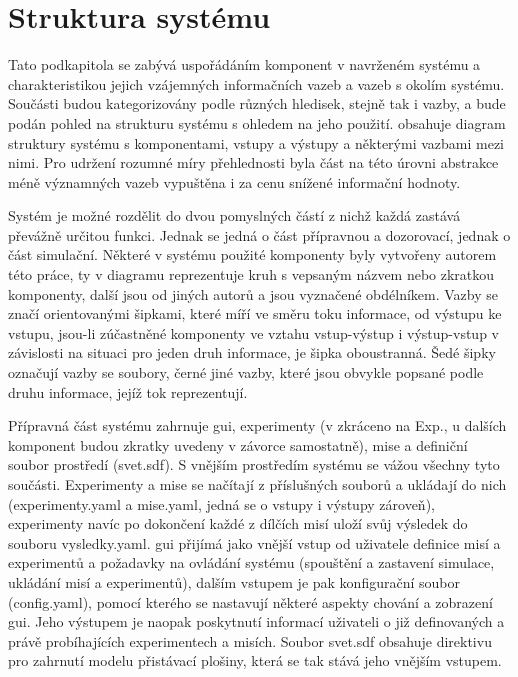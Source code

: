   \section{Struktura systému} \label{sec:structure}
    Tato podkapitola se zabývá uspořádáním komponent v navrženém systému a charakteristikou jejich vzájemných informačních vazeb a vazeb s okolím systému. Součásti budou kategorizovány podle různých hledisek, stejně tak i vazby, a bude podán pohled na strukturu systému s ohledem na jeho použití.  obsahuje diagram struktury systému s komponentami, vstupy a výstupy a některými vazbami mezi nimi. Pro udržení rozumné míry přehlednosti byla část na této úrovni abstrakce méně významných vazeb vypuštěna i za cenu snížené informační hodnoty.

    Systém je možné rozdělit do dvou pomyslných částí z nichž každá zastává převážně určitou funkci. Jednak se jedná o část přípravnou a dozorovací, jednak o část simulační. Některé v systému použité komponenty byly vytvořeny autorem této práce, ty v diagramu reprezentuje kruh s vepsaným názvem nebo zkratkou komponenty, další jsou od jiných autorů a jsou vyznačené obdélníkem. Vazby se značí orientovanými šipkami, které míří ve směru toku informace, od výstupu ke vstupu, jsou-li zúčastněné komponenty ve vztahu vstup-výstup i výstup-vstup v závislosti na situaci pro jeden druh informace, je šipka oboustranná. Šedé šipky označují vazby se soubory, černé jiné vazby, které jsou obvykle popsané podle druhu informace, jejíž tok reprezentují.
    
    Přípravná část systému zahrnuje \acrshort{gui}, experimenty (v  zkráceno na Exp., u dalších komponent budou zkratky uvedeny v závorce samostatně), mise a definiční soubor prostředí (svet.sdf). S vnějším prostředím systému se vážou všechny tyto součásti. Experimenty a mise se načítají z příslušných souborů a ukládají do nich (experimenty.yaml a mise.yaml, jedná se o vstupy i výstupy zároveň), experimenty navíc po dokončení každé z dílčích misí uloží svůj výsledek do souboru vysledky.yaml. \Acrshort{gui} přijímá jako vnější vstup od uživatele definice misí a experimentů a požadavky na ovládání systému (spouštění a zastavení simulace, ukládání misí a experimentů), dalším vstupem je pak konfigurační soubor (config.yaml), pomocí kterého se nastavují některé aspekty chování a zobrazení \acrshort{gui}. Jeho výstupem je naopak poskytnutí informací uživateli o již definovaných a právě probíhajících experimentech a misích. Soubor svet.sdf obsahuje direktivu pro zahrnutí modelu přistávací plošiny, která se tak stává jeho vnějším vstupem.

